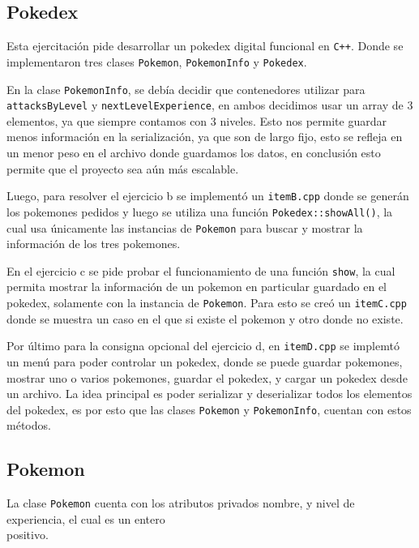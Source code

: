 \documentclass[11pt, a4paper]{article}
\begin{document}
\begin{multicols}{2}

\section{Pokedex}

Esta ejercitación pide desarrollar un pokedex digital funcional en \lstinline|C++|. Donde se implementaron tres clases \lstinline|Pokemon|, \lstinline|PokemonInfo| y \lstinline|Pokedex|.

En la clase \lstinline|PokemonInfo|, se debía decidir que contenedores utilizar para \lstinline|attacksByLevel| y \lstinline|nextLevelExperience|, en ambos decidimos usar un array de 3 elementos, ya que siempre contamos con 3 niveles. Esto nos permite guardar menos información en la serialización, ya que son de largo fijo, esto se refleja en un menor peso en el archivo donde guardamos los datos, en conclusión esto permite que el proyecto sea aún más escalable.

Luego, para resolver el ejercicio b se implementó un \lstinline|itemB.cpp| donde se generán los pokemones pedidos y luego se utiliza una función \lstinline|Pokedex::showAll()|, la cual usa únicamente las instancias de \lstinline|Pokemon| para buscar y mostrar la información de los tres pokemones.

\columnbreak

En el ejercicio c se pide probar el funcionamiento de una función \lstinline|show|, la cual permita mostrar la información de un pokemon en particular guardado en el pokedex, solamente con la instancia de \lstinline|Pokemon|. Para esto se creó un \lstinline|itemC.cpp| donde se muestra un caso en el que si existe el pokemon y otro donde no existe.

Por último para la consigna opcional del ejercicio d, en \lstinline|itemD.cpp| se implemtó un menú para poder controlar un pokedex, donde se puede guardar pokemones, mostrar uno o varios pokemones, guardar el pokedex, y cargar un pokedex desde un archivo. La idea principal es poder serializar y deserializar todos los elementos del pokedex, es por esto que las clases \lstinline|Pokemon| y \lstinline|PokemonInfo|, cuentan con estos métodos.

\columnbreak

\subsection{Pokemon}

La clase \lstinline|Pokemon| cuenta con los atributos privados nombre, y nivel de experiencia, el cual es un entero \\positivo.


\end{multicols}
\end{document}

